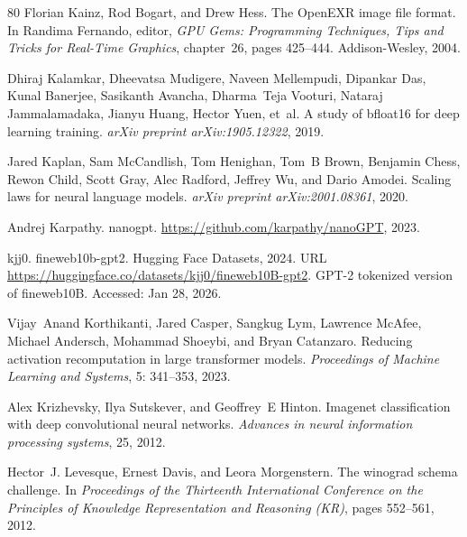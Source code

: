 \documentclass[10pt,twocolumn,letterpaper]{article}
\theoremstyle{plain}
\theoremstyle{definition}
\theoremstyle{remark}
\begin{document}
{\begin{thebibliography}{80}
Florian Kainz, Rod Bogart, and Drew Hess.
\newblock The {OpenEXR} image file format.
\newblock In Randima Fernando, editor, \emph{GPU Gems: Programming Techniques,
  Tips and Tricks for Real-Time Graphics}, chapter~26, pages 425--444.
  Addison-Wesley, 2004.

Dhiraj Kalamkar, Dheevatsa Mudigere, Naveen Mellempudi, Dipankar Das, Kunal
  Banerjee, Sasikanth Avancha, Dharma~Teja Vooturi, Nataraj Jammalamadaka,
  Jianyu Huang, Hector Yuen, et~al.
\newblock A study of bfloat16 for deep learning training.
\newblock \emph{arXiv preprint arXiv:1905.12322}, 2019.

Jared Kaplan, Sam McCandlish, Tom Henighan, Tom~B Brown, Benjamin Chess, Rewon
  Child, Scott Gray, Alec Radford, Jeffrey Wu, and Dario Amodei.
\newblock Scaling laws for neural language models.
\newblock \emph{arXiv preprint arXiv:2001.08361}, 2020.

Andrej Karpathy.
\newblock nanogpt.
\newblock \url{https://github.com/karpathy/nanoGPT}, 2023.

kjj0.
\newblock fineweb10b-gpt2.
\newblock Hugging Face Datasets, 2024.
\newblock URL \url{https://huggingface.co/datasets/kjj0/fineweb10B-gpt2}.
\newblock GPT-2 tokenized version of fineweb10B. Accessed: Jan 28, 2026.

Vijay~Anand Korthikanti, Jared Casper, Sangkug Lym, Lawrence McAfee, Michael
  Andersch, Mohammad Shoeybi, and Bryan Catanzaro.
\newblock Reducing activation recomputation in large transformer models.
\newblock \emph{Proceedings of Machine Learning and Systems}, 5:
  341--353, 2023.

Alex Krizhevsky, Ilya Sutskever, and Geoffrey~E Hinton.
\newblock Imagenet classification with deep convolutional neural networks.
\newblock \emph{Advances in neural information processing systems}, 25, 2012.

Hector~J. Levesque, Ernest Davis, and Leora Morgenstern.
\newblock The winograd schema challenge.
\newblock In \emph{Proceedings of the Thirteenth International Conference on
  the Principles of Knowledge Representation and Reasoning (KR)}, pages
  552--561, 2012.


\end{thebibliography}}
\end{document}
